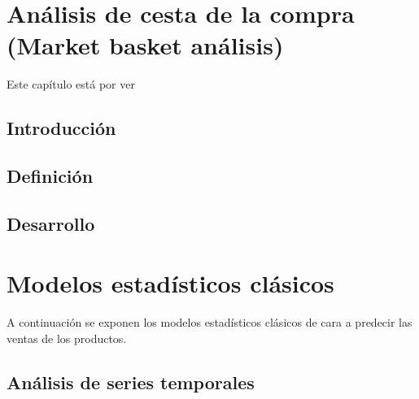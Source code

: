 \documentclass[12pt,a4paper,]{book}
\def\ifdoblecara{} %
\def\ifprincipal{} %
\numberwithin{dummy}{section}
\theoremstyle{ocrenumbox}
\theoremstyle{blacknumex}
\theoremstyle{blacknumbox}
\theoremstyle{ocrenum}
\theoremstyle{ocrenum}
\begin{document}
\hypertarget{anuxe1lisis-de-cesta-de-la-compra-market-basket-anuxe1lisis}{%
\chapter{Análisis de cesta de la compra (Market basket
análisis)}\label{anuxe1lisis-de-cesta-de-la-compra-market-basket-anuxe1lisis}}

Este capítulo está por ver

\hypertarget{introducciuxf3n}{%
\section{Introducción}\label{introducciuxf3n}}

\hypertarget{definiciuxf3n}{%
\section{Definición}\label{definiciuxf3n}}

\hypertarget{desarrollo}{%
\section{Desarrollo}\label{desarrollo}}

\FloatBarrier

\ifdefined\ifprincipal
\else
\setlength{\parindent}{1em}
\pagestyle{fancy}
\setcounter{tocdepth}{4}
\tableofcontents

\fi

\ifdefined\ifdoblecara
\fancyhead{}{}
\fancyhead[LE,RO]{\scriptsize\rightmark}
\fancyfoot[LO,RE]{\scriptsize\slshape \leftmark}
\fancyfoot[C]{}
\fancyfoot[LE,RO]{\footnotesize\thepage}
\else
\fancyhead{}{}
\fancyhead[RO]{\scriptsize\rightmark}
\fancyfoot[LO]{\scriptsize\slshape \leftmark}
\fancyfoot[C]{}
\fancyfoot[RO]{\footnotesize\thepage}
\fi
\renewcommand{\headrulewidth}{0.4pt}
\renewcommand{\footrulewidth}{0.4pt}

\hypertarget{modelos-estaduxedsticos-cluxe1sicos}{%
\chapter{Modelos estadísticos
clásicos}\label{modelos-estaduxedsticos-cluxe1sicos}}

A continuación se exponen los modelos estadísticos clásicos de cara a
predecir las ventas de los productos.

\hypertarget{anuxe1lisis-de-series-temporales}{%
\section{Análisis de series
temporales}\label{anuxe1lisis-de-series-temporales}}
\end{document}
